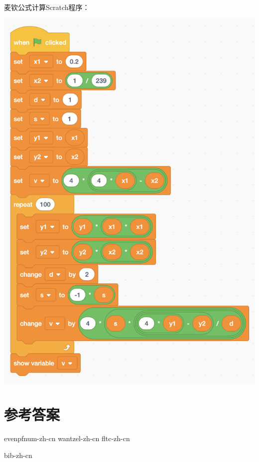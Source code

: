 \documentclass[b5paper]{ctexart}
\begin{document}
\begin{Answer}[ref={ex:reals}]
{麦钦公式计算Scratch程序：
\begin{center}
 \includegraphics[scale=0.4]{img/scratch-machin}
 \label{fig:scratch-machin}
\end{center}

}

\end{Answer}

\ifx\wholebook\relax \else
\section{参考答案}
\shipoutAnswer

{evenpfnum-zh-cn}
{wantzel-zh-cn}
{fltc-zh-cn}

\begin{thebibliography}{99}
{bib-zh-cn}
\end{thebibliography}

\expandafter\enddocument
\fi
\end{document}
